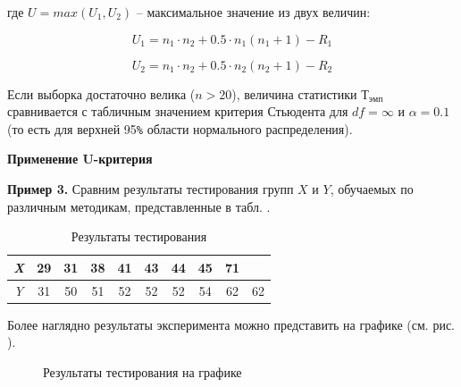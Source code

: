 \documentclass[12pt]{article}
\begin{document}
где $U = max(U_1, U_2)$ – максимальное значение из двух величин:

\begin{equation}
    U_1 = n_1 \cdot n_2 + 0.5 \cdot n_1(n_1+1)-R_1
\end{equation}

\begin{equation}
    U_2 = n_1 \cdot n_2 + 0.5 \cdot n_2(n_2+1)-R_2
\end{equation}
                                           
Если выборка достаточно велика ($n > 20$), величина статистики $Т_{эмп}$ сравнивается с табличным значением критерия Стьюдента для $df = \infty$ и $\alpha = 0.1$ (то есть для верхней 95\verb!%! области нормального распределения).

\medskip
\textbf{Применение U-критерия}

\medskip
\textbf{Пример 3.} Сравним результаты тестирования групп $X$ и $Y$, обучаемых по различным методикам, представленные в табл. . 

\begin{table}[h]
    \centering
    \caption{Результаты тестирования}
    \bigskip
    \begin{tabular}{|c|c|c|c|c|c|c|c|c|c|} \hline
         \textit{X} &29&31&38&41&43&44&45&71&  \\ \hline
         \textit{Y} &31&50&51&52&52&52&54&62&62  \\  \hline
    \end{tabular}
\end{table}
Более наглядно результаты эксперимента можно представить на графике (см. рис. ).

\begin{figure}[htbp]
    \centering
    \caption{Результаты тестирования на графике}
    \label{fig:enter-label}
\end{figure}
\end{document}

